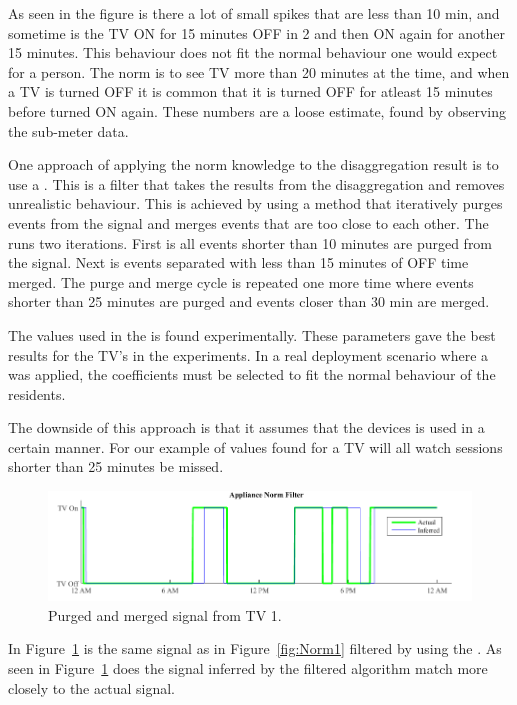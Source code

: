 As seen in the figure is there a lot of small spikes that are less than 10 min, and sometime is the TV ON for 15 minutes OFF in 2 and then ON again for another 15 minutes. This behaviour does not fit the normal behaviour one would expect for a person. The norm is to see TV more than 20 minutes at the time, and when a TV is turned OFF it is common that it is turned OFF for atleast 15 minutes before turned ON again. These numbers are a loose estimate, found by observing the sub-meter data. 


One approach of applying the norm knowledge to the disaggregation result is to use a . This is a filter that takes the results from the disaggregation and removes unrealistic behaviour. This is achieved by using a method that iteratively purges events from the signal and merges events that are too close to each other. The  runs two iterations. First is all events shorter than 10 minutes are purged from the signal. Next is events separated with less than 15 minutes of OFF time merged. The purge and merge cycle is repeated one more time where events shorter than 25 minutes are purged and events closer than 30 min are merged. 

The values used in the  is found experimentally. These parameters gave the best results for the TV's in the experiments. In a real deployment scenario where a  was applied, the coefficients must be selected to fit the normal behaviour of the residents.

The downside of this approach is that it assumes that the devices is used in a certain manner. For our example of values found for a TV will all watch sessions shorter than 25 minutes be missed.

\begin{figure}[H]
\centering
\includegraphics[width=1\textwidth]{billeder/AppNormFilterH10_2.png}
\caption{Purged and merged signal from TV 1.}
\label{fig:Norm2}
\end{figure}

In Figure~\ref{fig:Norm2} is the same signal as in Figure~\ref{fig:Norm1} filtered by using the . As seen in Figure~\ref{fig:Norm2} does the signal inferred by the filtered  algorithm match more closely to the actual signal. 

